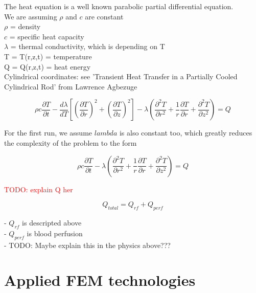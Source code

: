 \documentclass[parskip=half, titlepage=yes, 12pt, BCOR=12mm, DIV=calc]{scrartcl}
\begin{document}
The heat equation is a well known parabolic partial differential equation. \\

We are assuming $\rho$ and $c$ are constant \\
$\rho$ = density \\
$c$ = specific heat capacity \\
$\lambda$ = thermal conductivity, which is depending on T \\
T = T(r,z,t) = temperature \\
Q = Q(r,z,t) = heat energy \\


Cylindrical coordinates: see 'Transient Heat Transfer in a Partially Cooled Cylindrical Rod' from Lawrence Agbezuge

\begin{equation}
    \rho c \frac{\partial T}{\partial t} -  \frac{d\lambda}{dT} \left[ \left( \frac{\partial T}{\partial r} \right)^2 + \left( \frac{\partial T}{\partial z} \right)^2 \right] - \lambda \left( \frac{\partial^2 T}{\partial r^2} + \frac{1}{r} \frac{\partial T}{\partial r} + \frac{\partial^2 T}{\partial z^2} \right) = Q
\end{equation}

For the first run, we assume $lambda$ is also constant too, which greatly reduces the complexity of the problem to the form

\begin{equation}
    \rho c \frac{\partial T}{\partial t} - \lambda \left( \frac{\partial^2 T}{\partial r^2} + \frac{1}{r} \frac{\partial T}{\partial r} + \frac{\partial^2 T}{\partial z^2} \right) = Q
\end{equation}

\textcolor{red}{TODO: explain Q her}

\begin{equation}
    Q_{total} = Q_{rf} + Q_{perf}
\end{equation}

- $Q_{rf}$ is descripted above \\
- $Q_{perf}$ is blood perfusion \\
- TODO: Maybe explain this in the physics above??? \\






\section{Applied FEM technologies}
\end{document}
